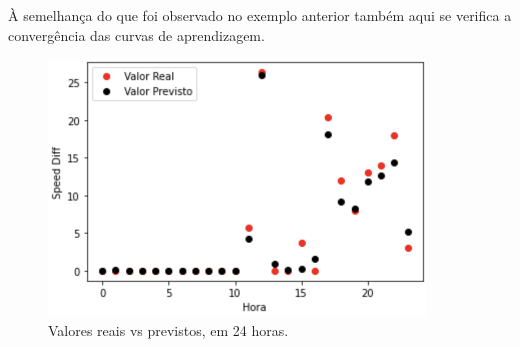 \documentclass[a4paper, 12pt]{article}
\begin{document}
À semelhança do que foi observado no exemplo anterior também aqui se verifica a convergência das curvas de aprendizagem.

\begin{figure}[H]
	\centering
	\includegraphics[width=10cm]{resultados/real_prev_3.png}
	\caption{Valores reais vs previstos, em 24 horas.}
\end{figure}
\end{document}
